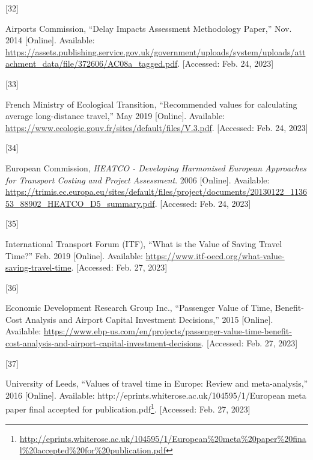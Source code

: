 \documentclass[
  11pt,
  a4paper,
]{book}
\newlength{\cslhangindent}
\newlength{\csllabelwidth}
\newlength{\cslentryspacingunit} %
\newenvironment{CSLReferences}[2] %
 {%
  \setlength{\parindent}{0pt}
  \ifodd #1
  \let\oldpar\par
  \def\par{\hangindent=\cslhangindent\oldpar}
  \fi
  \setlength{\parskip}{#2\cslentryspacingunit}
 }%
 {}
\newcommand{\CSLLeftMargin}[1]{\parbox[t]{\csllabelwidth}{#1}}
\newcommand{\CSLRightInline}[1]{\parbox[t]{\linewidth - \csllabelwidth}{#1}\break}
\DeclareRobustCommand{\href}[2]{#2\footnote{\url{#1}}}
\begin{document}
\begin{CSLReferences}{0}{0}
\leavevmode{}%
\CSLLeftMargin{{[}32{]} }%
\CSLRightInline{Airports Commission, {``Delay {Impacts Assessment}
{Methodology Paper},''} Nov. 2014 {[}Online{]}. Available:
\url{https://assets.publishing.service.gov.uk/government/uploads/system/uploads/attachment_data/file/372606/AC08a_tagged.pdf}.
{[}Accessed: Feb. 24, 2023{]}}

\leavevmode{}%
\CSLLeftMargin{{[}33{]} }%
\CSLRightInline{French Ministry of Ecological Transition, {``Recommended
values for calculating average long-distance travel,''} May 2019
{[}Online{]}. Available:
\url{https://www.ecologie.gouv.fr/sites/default/files/V.3.pdf}.
{[}Accessed: Feb. 24, 2023{]}}

\leavevmode{}%
\CSLLeftMargin{{[}34{]} }%
\CSLRightInline{European Commission, \emph{{HEATCO} - {Developing
Harmonised European Approaches} for {Transport Costing} and {Project
Assessment}}. 2006 {[}Online{]}. Available:
\url{https://trimis.ec.europa.eu/sites/default/files/project/documents/20130122_113653_88902_HEATCO_D5_summary.pdf}.
{[}Accessed: Feb. 24, 2023{]}}

\leavevmode{}%
\CSLLeftMargin{{[}35{]} }%
\CSLRightInline{International Transport Forum (ITF), {``What is the
{Value} of {Saving Travel Time}?''} Feb. 2019 {[}Online{]}. Available:
\url{https://www.itf-oecd.org/what-value-saving-travel-time}.
{[}Accessed: Feb. 27, 2023{]}}

\leavevmode{}%
\CSLLeftMargin{{[}36{]} }%
\CSLRightInline{Economic Development Research Group Inc., {``Passenger
{Value} of {Time}, {Benefit-Cost Analysis} and {Airport Capital
Investment Decisions},''} 2015 {[}Online{]}. Available:
\url{https://www.ebp-us.com/en/projects/passenger-value-time-benefit-cost-analysis-and-airport-capital-investment-decisions}.
{[}Accessed: Feb. 27, 2023{]}}

\leavevmode{}%
\CSLLeftMargin{{[}37{]} }%
\CSLRightInline{University of Leeds, {``Values of travel time in
{Europe}: {Review} and meta-analysis,''} 2016 {[}Online{]}. Available:
\href{http://eprints.whiterose.ac.uk/104595/1/European\%20meta\%20paper\%20final\%20accepted\%20for\%20publication.pdf}{http://eprints.whiterose.ac.uk/104595/1/European
meta paper final accepted for publication.pdf}. {[}Accessed: Feb. 27,
2023{]}}


\end{CSLReferences}
\end{document}
